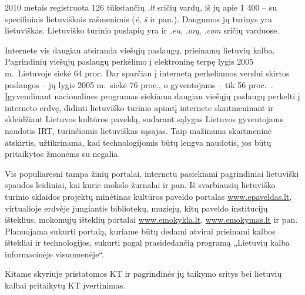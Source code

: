 \begin{multicols}{2}

2010 metais registruota 126 tūkstančių \textit{.lt} sričių vardų, iš jų apie 1 400 –  su specifiniais lietuviškais rašmenimis (\textit{ė}, \textit{š} ir pan.). Daugumos jų turinys yra lietuviškas. Lietuviško turinio puslapių yra ir \textit{.eu}, \textit{.org}, \textit{.com} sričių varduose.   

 Internete vis daugiau atsiranda viešųjų paslaugų, prieinamų lietuvių kalba. Pagrindinių viešųjų paslaugų perkėlimo į elektroninę terpę lygis 2005 m.~Lietuvoje siekė 64 proc. Dar sparčiau į internetą perkeliamos verslui skirtos paslaugos – jų lygis 2005 m.~siekė 76 proc., o gyventojams – tik 56 proc.~\cite{esparama}.  Įgyvendinant nacionalines programas siekiama daugiau viešųjų paslaugų perkelti į interneto erdvę, didinti lietuviško turinio apimtį internete skaitmeninant ir skleidžiant Lietuvos kultūros paveldą, sudarant sąlygas Lietuvos gyventojams naudotis IRT, turinčiomis lietuviškas sąsajas. Taip mažinama skaitmeninė atskirtis, užtikrinama, kad technologijomis būtų lengva naudotis, jos būtų pritaikytos žmonėms su negalia.   


   Vis populiaresni tampa žinių portalai, internetu pasiekiami pagrindiniai lietuviški spaudos leidiniai, kai kurie mokslo žurnalai ir pan. Iš svarbiausių lietuviško turinio sklaidos projektų minėtinas kultūros paveldo portalas \url{www.epaveldas.lt}, virtualioje erdvėje jungiantis bibliotekų, muziejų, kitų paveldo institucijų išteklius, mokomųjų išteklių portalai \url{www.emokykla.lt}, \url{www.emokymas.lt} ir pan. Planuojama sukurti portalą, kuriame būtų dedami atvirai prieinami kalbos ištekliai ir technologijos, sukurti pagal prasidedančią programą „Lietuvių kalba informacinėje visuomenėje“.  

Kitame skyriuje pristatomos KT ir pagrindinės jų taikymo sritys bei lietuvių kalbai pritaikytų KT įvertinimas.

\end{multicols}

\clearpage

